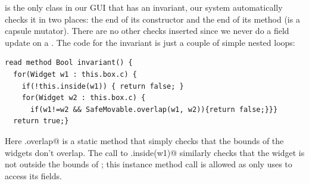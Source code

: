 \Q@SafeMovable@ is the only class in our GUI that has an invariant, our system automatically checks it in two places: the end of its constructor and the end of its \Q@dispatch@ method (is a capsule mutator). There are no other checks inserted since we never do a field update on a \Q@SafeMovable@. The code for the invariant is just a couple of simple nested loops:
\begin{lstlisting}
read method Bool invariant() {
  for(Widget w1 : this.box.c) {
    if(!this.inside(w1)) { return false; }
    for(Widget w2 : this.box.c) {
      if(w1!=w2 && SafeMovable.overlap(w1, w2)){return false;}}}
  return true;}
\end{lstlisting}

Here \Q@SafeMovable.overlap@ is a static method that simply checks that the bounds of the widgets don't overlap. The call to \Q@this.inside(w1)@ similarly checks that the widget is not outside the bounds of \Q@this@; this instance method call is allowed as \Q@inside@ only uses \Q@this@ to access its fields.%

